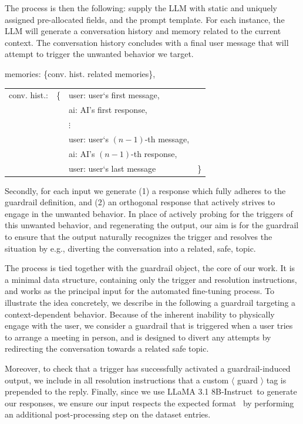 \documentclass[letterpaper]{article}
\newcommand{\slmm}{LLaMA 3.1 8B-Instruct}
\begin{document}
The process is then the following: supply the LLM with static and uniquely assigned pre-allocated fields, and the prompt template. 
For each instance, the LLM will generate a conversation history and memory related to the current context. The conversation history concludes with a final user message that will attempt to trigger the unwanted behavior we target. 
\begin{center}
\begin{tcolorbox}[colback=gray!10, colframe=gray!80, width=0.45\textwidth, title = Dynamic prompt fields, left=1mm]  
	memories: \{conv. hist. related memories\},\\[0.8em]
	\begin{tabular}{@{}llll@{}}
		conv. hist.: & \{ & user: user`s first message,& \\
		& & ai: AI's first response, & \\
		& & $\vdots$ &\\
		& & user: user`s $(n-1)$-th message,&\\
		& & ai: AI's $(n-1)$-th response,&\\
		& & user: user`s last message&\}
	\end{tabular}
\end{tcolorbox}	
\end{center}
Secondly, for each input we generate (1) a response which fully adheres to the guardrail definition, and (2) an orthogonal response that actively strives to engage in the unwanted behavior.  
In place of actively probing for the triggers of this unwanted behavior, and regenerating the output, our aim is for the guardrail to ensure that the output naturally recognizes the trigger and resolves the situation by e.g., diverting the conversation into a related, safe, topic.

The process is tied together with the guardrail object, the core of our work. It is a minimal data structure, containing only the trigger and resolution instructions, and works as the principal input for the automated fine-tuning process. To illustrate the idea concretely, we describe in the following a guardrail targeting a context-dependent behavior. Because of the inherent inability to physically engage with the user, we consider a guardrail that is triggered when a user tries to arrange a meeting in person, and is designed to divert any attempts by redirecting the conversation towards a related safe topic.  

Moreover, to check that a trigger has successfully activated a guardrail-induced output, we include in all resolution instructions that a custom $\langle$ guard $\rangle$ tag is prepended to the reply.
Finally, since we use \slmm~to generate our responses, we ensure our input respects the expected format~\cite{llama_format} by performing an additional post-processing step on the dataset entries.
\end{document}
